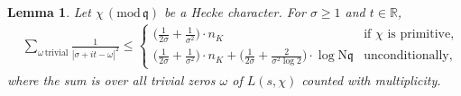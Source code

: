 \documentclass[12pt,psamsfonts]{amsart}
\newtheorem{lem}[thm]{Lemma}
\theoremstyle{definition}
\theoremstyle{remark}
\numberwithin{equation}{section}
\theoremstyle{plain}
\theoremstyle{remark}
\renewcommand{\1}{ {\bf 1}}
\renewcommand{\pmod}[1]{\, (\mathrm{mod} {\, #1})}
\newcommand{\N}{\mathrm{N}}
\newcommand{\kq}{\mathfrak{q}}
\newcommand{\R}{\mathbb{R}}
\begin{document}
  \begin{lem} \label{DH-TrivialZeroSum} Let $\chi \pmod{\kq}$ be a Hecke character. For $\sigma \geq 1$ and $t \in \R$, 
\begin{align*}
& \sum_{\omega \, \mathrm{ trivial}} \frac{1}{|\sigma+it-\omega|^2}  \leq  \begin{cases} \big( \frac{1}{2\sigma} + \frac{1}{\sigma^2} \big)  \cdot n_K & \text{if $\chi$ is primitive,} \\
\big( \frac{1}{2\sigma} + \frac{1}{\sigma^2} \big) \cdot n_K + \big(  \frac{1}{2 \sigma} + \frac{2}{\sigma^2 \log 2}  \big) \cdot  \log \N\kq   & \text{unconditionally}, 
\end{cases}
\end{align*}
where the sum is over all trivial zeros $\omega$ of $L(s,\chi)$ counted with multiplicity.
\end{lem}
\end{document}
